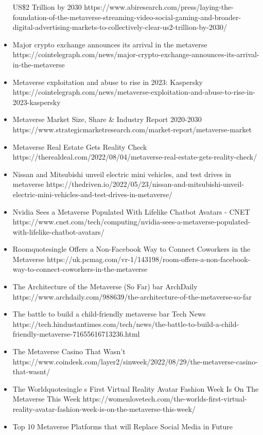 \begin{itemize}
  US\$2 Trillion by 2030
  https://www.abiresearch.com/press/laying-the-foundation-of-the-metaverse-streaming-video-social-gaming-and-broader-digital-advertising-markets-to-collectively-clear-us2-trillion-by-2030/
\item
  Major crypto exchange announces its arrival in the metaverse
  https://cointelegraph.com/news/major-crypto-exchange-announces-its-arrival-in-the-metaverse
\item
  Metaverse exploitation and abuse to rise in 2023: Kaspersky
  https://cointelegraph.com/news/metaverse-exploitation-and-abuse-to-rise-in-2023-kaspersky
\item
  Metaverse Market Size, Share \& Industry Report 2020-2030
  https://www.strategicmarketresearch.com/market-report/metaverse-market
\item
  Metaverse Real Estate Gets Reality Check
  https://therealdeal.com/2022/08/04/metaverse-real-estate-gets-reality-check/
\item
  Nissan and Mitsubishi unveil electric mini vehicles, and test drives
  in metaverse
  https://thedriven.io/2022/05/23/nissan-and-mitsubishi-unveil-electric-mini-vehicles-and-test-drives-in-metaverse/
\item
  Nvidia Sees a Metaverse Populated With Lifelike Chatbot Avatars - CNET
  https://www.cnet.com/tech/computing/nvidia-sees-a-metaverse-populated-with-lifelike-chatbot-avatars/
\item
  Roomquotesingle{} Offers a Non-Facebook Way to Connect Coworkers
  in the Metaverse
  https://uk.pcmag.com/vr-1/143198/room-offers-a-non-facebook-way-to-connect-coworkers-in-the-metaverse
\item
  The Architecture of the Metaverse (So Far) bar{} ArchDaily
  https://www.archdaily.com/988639/the-architecture-of-the-metaverse-so-far
\item
  The battle to build a child-friendly metaverse bar{} Tech News
  https://tech.hindustantimes.com/tech/news/the-battle-to-build-a-child-friendly-metaverse-71655616713236.html
\item
  The Metaverse Casino That Wasn't
  https://www.coindesk.com/layer2/sinweek/2022/08/29/the-metaverse-casino-that-wasnt/
\item
  The Worldquotesingle s First Virtual Reality Avatar Fashion Week
  Is On The Metaverse This Week
  https://womenlovetech.com/the-worlds-first-virtual-reality-avatar-fashion-week-is-on-the-metaverse-this-week/
\item
  Top 10 Metaverse Platforms that will Replace Social Media in Future

\end{itemize}
